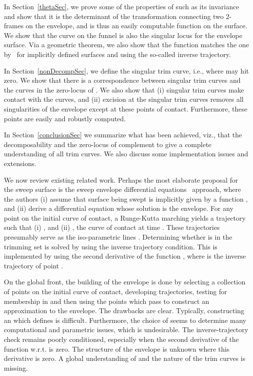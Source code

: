 \documentclass{elsart5p}
\begin{document}
In Section~\ref{thetaSec}, we prove some of the properties of  such as 
its invariance and show that it is the determinant of the transformation
connecting two 2-frames on the envelope, and is thus an easily computable 
function on the surface. We show that the 
curve on the funnel is also the singular locus for the envelope surface.
Via a geometric theorem, we also show that the function  matches
the one by~\cite{trimming}  for implicitly defined surfaces and using the so-called
inverse trajectory.

In Section~\ref{nonDecompSec}, we define the singular trim curve, i.e., where  may
hit zero. We show that there is a correspondence between singular trim
curves and the curves in the zero-locus of . We also show
that (i) singular trim curves make contact with the  curves, and
(ii) excision at the singular trim curves removes all singularities
of the envelope except at these points of contact. Furthermore, these 
points are easily and robustly computed.

In Section~\ref{conclusionSec} we summarize what has been achieved, viz., that the
decomposability and the zero-locus of  complement to give a complete
understanding of all trim curves. We also discuss some implementation issues
and extensions.


We now review existing related work. 
Perhaps the most elaborate proposal for the sweep surface  is the 
sweep envelope differential equations~\cite{sede} approach, where the authors 
(i) assume that surface  being swept is implicitly given by a function , and (ii) derive a 
differential equation whose solution 
is the envelope.  For any point  on the initial curve of contact, 
a Runge-Kutta marching yields a trajectory   such that (i) , 
and (ii) , the curve of contact at time .  
These trajectories presumably serve as the iso-parametric lines .  
Determining whether  is in the trimming set  is solved by using the inverse trajectory 
condition. This is implemented by using 
the second derivative of the function , where  is the inverse trajectory of point . 

On the global front, the building of the envelope  is 
done by selecting a collection of points on the initial curve of 
contact, developing trajectories, testing for membership in  and then 
using the points which pass to construct an approximation to the envelope. 
The drawbacks are clear. Typically, constructing an  which defines  is 
difficult. Furthermore, the choice of  seems to determine many computational
and parametric issues, which is undesirable. The inverse-trajectory check 
remains poorly conditioned, especially when the second derivative of 
the function  w.r.t.  is zero. The structure of the envelope is unknown where 
this derivative is zero.  
A global understanding of  and the nature of
the trim curves is missing.  
\end{document}
